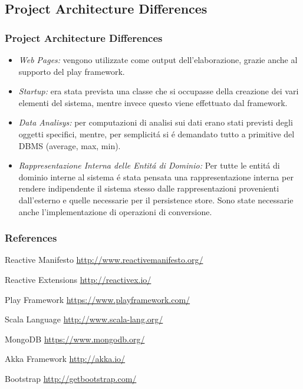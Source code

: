 \documentclass{beamer}
\begin{document}
\subsection{Project Architecture Differences}

\begin{frame}
  \frametitle{Project Architecture Differences}
  \begin{itemize}
    \item \textit{Web Pages:} vengono utilizzate come output dell'elaborazione, grazie anche al supporto del play framework.
    \item \textit{Startup:} era stata prevista una classe che si occupasse della creazione dei vari elementi del sistema, mentre invece questo viene effettuato dal framework.
    \item \textit{Data Analisys:} per computazioni di analisi sui dati erano stati previsti degli oggetti specifici, mentre, per semplicit\'a si \'e demandato tutto a primitive del DBMS (average, max, min).
    \item \textit{Rappresentazione Interna delle Entit\'a di Dominio:} Per tutte le entit\'a di dominio interne al sistema \'e stata pensata una rappresentazione interna per rendere indipendente il sistema stesso dalle rappresentazioni provenienti dall'esterno e quelle necessarie per il persistence store. Sono state necessarie anche l'implementazione di operazioni di conversione.
  \end{itemize}
\end{frame}

\begin{frame}
\frametitle{References}
\footnotesize{
\begin{thebibliography}{99} %
   Reactive Manifesto
    \newblock \url{http://www.reactivemanifesto.org/}

   Reactive Extensions
    \newblock \url{http://reactivex.io/}

   Play Framework
    \newblock \url{https://www.playframework.com/}

   Scala Language
    \newblock \url{http://www.scala-lang.org/}

   MongoDB
    \newblock \url{https://www.mongodb.org/}


   Akka Framework
    \newblock \url{http://akka.io/}


   Bootstrap
    \newblock \url{http://getbootstrap.com/}

\end{thebibliography}
}
\end{frame}
\end{document}
